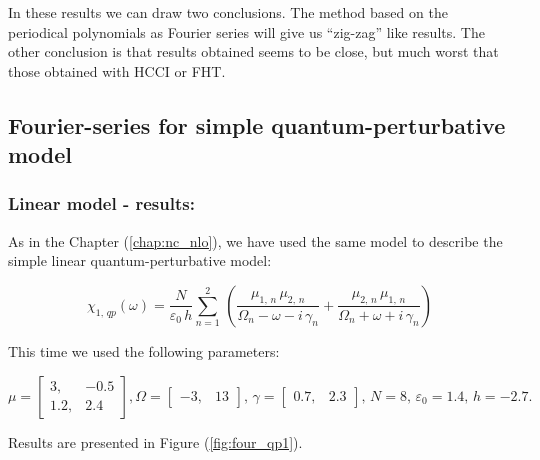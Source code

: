 \documentclass[12pt,twoside,a4paper]{article}
\numberwithin{equation}{subsection}
\numberwithin{figure}{subsection}
\begin{document}
In these results we can draw two conclusions. The method based on the periodical polynomials as Fourier series will
give us ``zig-zag'' like results. The other conclusion is that results obtained seems to be close, but much worst that those
obtained with HCCI or FHT. 

\subsection{Fourier-series for simple quantum-perturbative model} \label{chap:fourier_quantum}

\subsubsection*{Linear model - results:}

As in the Chapter (\ref{chap:nc_nlo}), we have used the same model to describe the simple linear quantum-perturbative model: 

\begin{equation} \label{eq:four_qp}
  \chi_{1, \,qp} (\omega ) = \frac {N}{\varepsilon_0 \, h} \sum_{n=1}^{2} \, 
  	\left(
  		\frac {\mu_{1, \,n} \, \mu_{2, \, n}}{\Omega_n - \omega - i \, \gamma_n} 
  	  + \frac {\mu_{2, \,n} \, \mu_{1, \, n}}{\Omega_n + \omega + i \, \gamma_n}
	\right)
\end{equation}

This time we used the following parameters: 

\begin{equation}
  \mu = \begin{bmatrix} 
    3,   & - 0.5 \\ 
    1.2, &   2.4
  \end{bmatrix},
  \Omega = \begin{bmatrix} 
    - 3, & 13
  \end{bmatrix}, \,
  \gamma = \begin{bmatrix} 
    0.7, & 2.3
  \end{bmatrix}, \,
  N = 8, \,
  \varepsilon_{0} = 1.4, \,
  h = - 2.7.
\end{equation} 

Results are presented in Figure (\ref{fig:four_qp1}). 
\end{document}
